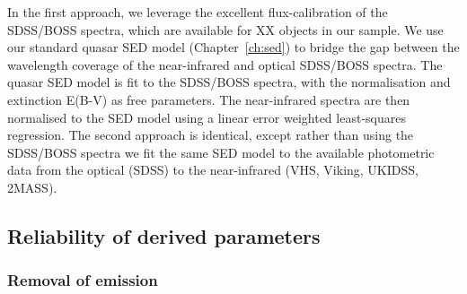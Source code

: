 In the first approach, we leverage the excellent flux-calibration of the \ac{SDSS}/\ac{BOSS} spectra, which are available for XX objects in our sample. 
We use our standard quasar \ac{SED} model (Chapter~\ref{ch:sed}) to bridge the gap between the wavelength coverage of the near-infrared and optical \ac{SDSS}/\ac{BOSS} spectra.
The quasar \ac{SED} model is fit to the \ac{SDSS}/\ac{BOSS} spectra, with the normalisation and extinction E(B-V) as free parameters. 
The near-infrared spectra are then normalised to the \ac{SED} model using a linear error weighted least-squares regression.  
The second approach is identical, except rather than using the \ac{SDSS}/\ac{BOSS} spectra we fit the same \ac{SED} model to the available photometric data from the optical (\ac{SDSS}) to the near-infrared (VHS, Viking, UKIDSS, 2MASS). 

\subsection{Reliability of derived parameters}

\subsubsection{Removal of  emission}

